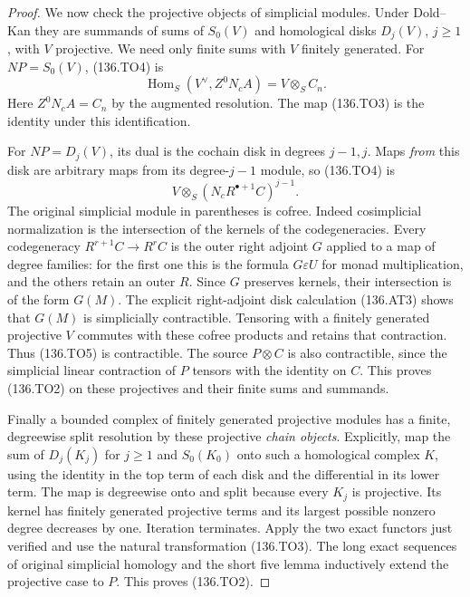 \begin{proof}
We now check the projective objects of simplicial modules.
Under Dold--Kan they are summands of sums of $S_0(V)$
and homological disks $D_j(V)$, $j\geq1$, with $V$
projective. We need only finite sums with $V$ finitely
generated. For $NP=S_0(V)$, (136.TO4) is
\[
           \operatorname{Hom}_S(V^\vee,Z^0N_cA)
                       =V\otimes_S C_n.
\]
Here $Z^0N_cA=C_n$ by the augmented resolution.
The map (136.TO3) is the identity under this
identification.

For $NP=D_j(V)$, its dual is the cochain disk in
degrees $j-1,j$. Maps \emph{from} this disk are arbitrary
maps from its degree-$j-1$ module, so (136.TO4) is
\[
                           V\otimes_S(N_cR^{\bullet+1}C)^{j-1}.
                                                               \tag{136.TO5}
\]
The original simplicial module in parentheses is cofree.
Indeed cosimplicial normalization is the intersection
of the kernels of the codegeneracies. Every codegeneracy
$R^{r+1}C\to R^rC$ is the outer right adjoint $G$
applied to a map of degree families: for the first
one this is the formula $G\varepsilon U$ for monad
multiplication, and the others retain an outer $R$.
Since $G$ preserves kernels, their intersection is of
the form $G(M)$. The explicit right-adjoint disk
calculation (136.AT3) shows that $G(M)$ is simplicially
contractible. Tensoring with a finitely generated
projective $V$ commutes with these cofree products and
retains that contraction. Thus (136.TO5) is contractible.
The source $P\otimes C$ is also contractible, since
the simplicial linear contraction of $P$ tensors with
the identity on $C$. This proves (136.TO2) on these
projectives and their finite sums and summands.

Finally a bounded complex of finitely generated
projective modules has a finite, degreewise split
resolution by these projective \emph{chain objects}.
Explicitly, map the sum of $D_j(K_j)$ for $j\geq1$
and $S_0(K_0)$ onto such a homological complex $K$,
using the identity in the top term of each disk and
the differential in its lower term. The map is
degreewise onto and split because every $K_j$ is
projective. Its kernel has finitely generated
projective terms and its largest possible nonzero
degree decreases by one. Iteration terminates.
Apply the two exact functors just verified and use
the natural transformation (136.TO3). The long exact
sequences of original simplicial homology and the
short five lemma inductively extend the projective
case to $P$. This proves (136.TO2).
\end{proof}

